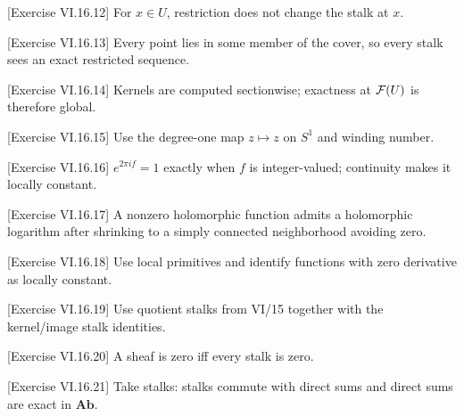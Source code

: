 \begin{hint}
[Exercise VI.16.12]
For $x\in U$, restriction does not change the stalk at $x$.
\end{hint}

\begin{hint}
[Exercise VI.16.13]
Every point lies in some member of the cover, so every stalk sees an exact restricted sequence.
\end{hint}

\begin{hint}
[Exercise VI.16.14]
Kernels are computed sectionwise; exactness at $\mathcal F(U)$ is therefore global.
\end{hint}

\begin{hint}
[Exercise VI.16.15]
Use the degree-one map $z\mapsto z$ on $S^1$ and winding number.
\end{hint}

\begin{hint}
[Exercise VI.16.16]
$e^{2\pi i f}=1$ exactly when $f$ is integer-valued; continuity makes it locally constant.
\end{hint}

\begin{hint}
[Exercise VI.16.17]
A nonzero holomorphic function admits a holomorphic logarithm after shrinking to a simply connected neighborhood avoiding zero.
\end{hint}

\begin{hint}
[Exercise VI.16.18]
Use local primitives and identify functions with zero derivative as locally constant.
\end{hint}

\begin{hint}
[Exercise VI.16.19]
Use quotient stalks from VI/15 together with the kernel/image stalk identities.
\end{hint}

\begin{hint}
[Exercise VI.16.20]
A sheaf is zero iff every stalk is zero.
\end{hint}

\begin{hint}
[Exercise VI.16.21]
Take stalks: stalks commute with direct sums and direct sums are exact in $\mathbf{Ab}$.
\end{hint}

